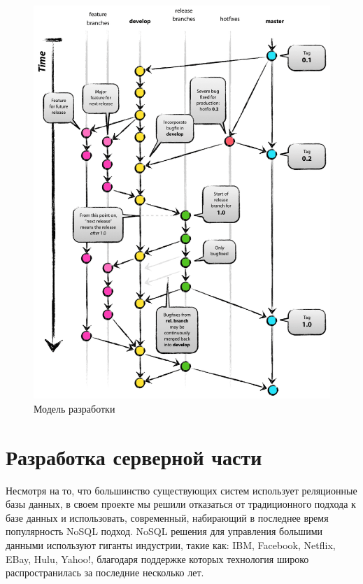 \documentclass[a4paper, 14pt]{extarticle}
\begin{document}
\begin{figure}[!htb]
  \centering
    \includegraphics[scale=0.3]{../d/pics/branching.png}
    \caption{Модель разработки}
    \label{fig:branching}
\end{figure}

\newpage

\section{Разработка серверной части}
Несмотря на то, что большинство существующих систем использует реляционные
базы данных, в своем проекте мы решили отказаться от традиционного подхода
к базе данных и использовать, современный, набирающий в последнее время популярность
NoSQL подход. NoSQL решения для управления большими данными используют гиганты индустрии,
такие как: IBM, Facebook, Netflix, EBay, Hulu, Yahoo!, благодаря поддержке которых технология
широко распространилась за последние несколько лет.
\end{document}
